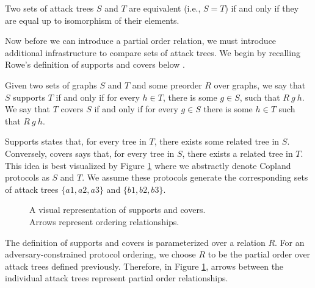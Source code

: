 \documentclass[runningheads]{llncs}
\theoremstyle{definition}
\begin{document}
\begin{definition}[Equivalence =]
    Two sets of attack trees $S$ and $T$ are equivalent (i.e., $S = T$) if and only if they are equal up to isomorphism of their elements.
\end{definition}

Now before we can introduce a partial order relation, we must introduce additional infrastructure to compare sets of attack trees. We begin by recalling Rowe's definition of supports and covers below \cite{Rowe:2021:OnOrdering}.

\begin{definition}
    Given two sets of graphs $S$ and $T$ and some preorder $R$ over graphs, we say that $S$ supports $T$ if and only if for every $h \in T$, there is some $g \in S$, such that $R\: g\: h$. We  say that $T$ covers $S$ if and only if for every $g \in S$ there is some $h \in T$ such that $R\: g\: h$.
\end{definition}

Supports states that, for every tree in $T$, there exists some related tree in $S$. Conversely, covers says that, for every tree in $S$, there exists a related tree in $T$.  This idea is best visualized by Figure \ref{fig:sup-cov} where we abstractly denote Copland protocols as $S$ and $T$. We assume these protocols generate the corresponding sets of attack trees $\{a1, a2 , a3 \}$ and $ \{b1, b2 ,b3\}$.

\begin{figure}[htbp]
    \centering
    
    \captionsetup{justification=centering,margin=1cm}
    \caption[Supports and covers]{A visual representation of supports and covers. \\ Arrows represent ordering relationships.}
    \label{fig:sup-cov}
\end{figure}

The definition of supports and covers is parameterized over a relation $R$. For an adversary-constrained protocol ordering, we choose $R$ to be the partial order over attack trees defined previously. Therefore, in Figure \ref{fig:sup-cov}, arrows between the individual attack trees represent partial order relationships.
\end{document}
